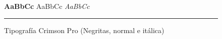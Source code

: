 \vspace{1em}
\begin{figure}[H]
    \centering
    {\LARGE\selectfont \textbf{AaBbCc} \quad  AaBbCc \quad \textit{AaBbCc}}
    \vspace{1em}
    \textcolor{Primario}{\rule{\linewidth}{0.2pt}}
    \vspace*{-2em}
    \caption{Tipografía Crimson Pro (Negritas, normal e itálica)}
    \label{fig:tipografía_crimson_pro}
\end{figure}